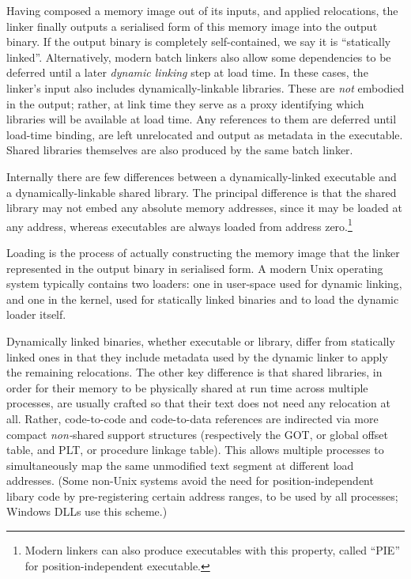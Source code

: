 Having composed a memory image out of its inputs, 
and applied relocations, 
the linker finally outputs a serialised form of this memory image
into the output binary.
If the output binary is completely self-contained, we say it is ``statically linked''. 
Alternatively, modern batch linkers also allow 
some dependencies to be deferred until a later \emph{dynamic linking} step at load time.
In these cases, the linker's input also includes dynamically-linkable libraries.
These are \emph{not} embodied in the output; rather,
at link time they serve as a proxy identifying which libraries will be available at load time.
Any references to them are deferred until load-time binding,
are left unrelocated and output as metadata in the executable.
Shared libraries themselves are also produced by the same batch linker.

Internally there are few differences
between a dynamically-linked executable and a dynamically-linkable shared library.
The principal difference is that the shared library may not 
embed any absolute memory addresses, since it may be loaded
at any address, whereas executables are always loaded from 
address zero.\footnote{Modern linkers can also produce executables
with this property, called ``PIE'' for position-independent executable.}

Loading is the process of actually 
constructing the memory image that the linker 
represented in the output binary in serialised form.
A modern Unix operating system typically contains two loaders: 
one in user-space used for dynamic linking,
and one in the kernel, used for statically linked binaries
and to load the dynamic loader itself.

Dynamically linked binaries, whether executable or library, 
differ from statically linked ones
in that they include metadata used by the dynamic linker
to apply the remaining relocations.
The other key difference is that 
shared libraries, in order for their memory to be physically 
shared at run time across multiple processes, 
are usually crafted so that their text does not need any relocation at all.
Rather, code-to-code and code-to-data references are indirected 
via more compact \emph{non-}shared support structures 
(respectively the GOT, or global offset table, and PLT, or procedure linkage table).
This allows multiple processes to simultaneously map the same unmodified text segment 
at different load addresses.
(Some non-Unix systems avoid the need for position-independent libary code by pre-registering 
certain address ranges, to be used by all processes; Windows DLLs use this scheme.)

